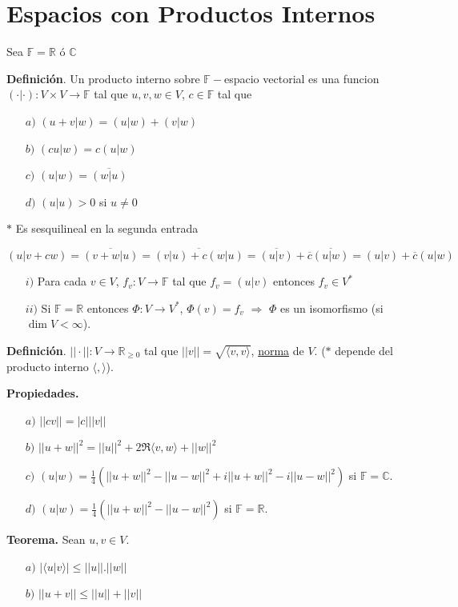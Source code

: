 \newpage
\section{{\Large Espacios con Productos Internos}}

Sea $\mathbb{F}=\mathbb{R}$ ó $\mathbb{C}$

\textbf{Definición}. Un producto interno sobre $\mathbb{F}-$espacio vectorial
es una funcion $(\cdot|\cdot):V\times V \to \mathbb{F}$ tal que $u, v, w \in V$,
$c\in\mathbb{F}$ tal que

\begin{itemize}
    \item[$a)$] $(u+v|w)=(u|w)+(v|w)$
    \item[$b)$] $(cu|w)=c(u|w)$
    \item[$c)$] $(u|w)=\overline{(w|u)}$
    \item[$d)$] $(u|u) > 0$ si $u \not = 0$
\end{itemize}

$\ast$ Es sesquilineal en la segunda entrada

$(u|v+cw) = \overline{(v+w|u)}
          = \overline{(v|u)+c(w|u)}
          = \overline{(u|v)}+\overline{c}\overline{(u|w)}
          = (u|v)+\overline{c}(u|w)$

\begin{itemize}
    \item[$i)$] Para cada $v \in V$, $f_{v}:V \to \mathbb{F}$ tal
    que $f_{v}=(u|v)$ entonces $f_{v}\in V^{\ast}$
    \item[$ii)$] Si $\mathbb{F}=\mathbb{R}$ entonces $\Phi:V
    \to V^{\ast}$, $\Phi(v)=f_{v}$ $\Rightarrow$
    $\Phi$ es un isomorfismo (si $\dim V < \infty$).
\end{itemize}

\textbf{Definición}. $||\cdot||:V \to\mathbb{R}_ {\geq 0}$
tal que $||v||=\sqrt{\langle v,v\rangle}$, \underline{norma} de $V$.
($\ast$ depende del producto interno $\langle , \rangle$).

\textbf{Propiedades.}

\begin{itemize}
    \item[$a)$] $||cv||=|c|||v||$
    \item[$b)$] $||u+w||^{2}=||u||^{2}+2\Re\langle v, w\rangle+||w||^{2}$
    \item[$c)$] $(u|w)=\frac{1}{4}\left(||u+w||^{2}
                                          -||u-w||^{2}
                                          +i||u+w||^{2}
                                          -i||u-w||^{2}\right)$ si $\mathbb{F}=\mathbb{C}$.
    \item[$d)$] $(u|w)=\frac{1}{4}\left(||u+w||^{2}
                                        -||u-w||^{2}\right)$ si $\mathbb{F}=\mathbb{R}$.
\end{itemize}

\textbf{Teorema.} Sean $u, v \in V$.

\begin{itemize}
	\item[$a)$] $|\langle u|v \rangle|\leq ||u||.||w||$
	\item[$b)$] $||u + v|| \leq ||u|| + ||v||$
\end{itemize}